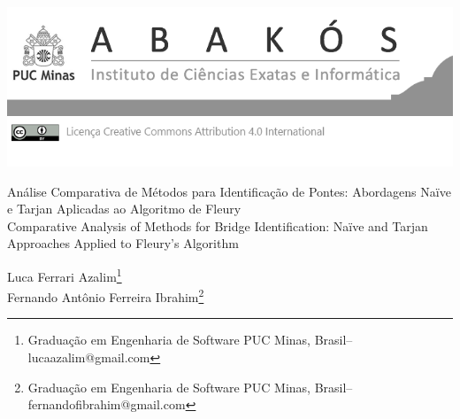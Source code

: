 \documentclass[a4paper,12pt,Times]{article}
\makeatletter
\newcommand{\monog}{Análise Comparativa de Métodos para Identificação de Pontes: Abordagens Naïve e Tarjan Aplicadas ao Algoritmo de Fleury}
\newcommand{\monogES}{Comparative Analysis of Methods for Bridge Identification: Naïve and Tarjan Approaches Applied to Fleury's Algorithm}
\newcommand{\origem}{Brasil}
\newcommand{\AutorA}{Luca Ferrari Azalim}
\newcommand{\funcaoA}{}
\newcommand{\emailA}{lucaazalim@gmail.com}
\newcommand{\cursA}{Graduação em Engenharia de Software PUC Minas}
\newcommand{\AutorB}{Fernando Antônio Ferreira Ibrahim}
\newcommand{\funcaoB}{}
\newcommand{\emailB}{fernandofibrahim@gmail.com}
\newcommand{\cursB}{Graduação em Engenharia de Software PUC Minas}
\makeatother
\begin{document}

\begin{flushleft}

\begin{minipage} [c][5cm][b]{16.5cm} %
\includegraphics[scale=1.1]{figuras/pucmg.png} 
\end{minipage}

 \vspace{0cm} {
 \singlespacing \Large{\monog {} \\ }
  \normalsize{\monogES}
 }
\end{flushleft}
\begin{flushright}
\singlespacing 
\normalsize{\AutorA \footnote{\funcaoA \cursA, \origem -- \emailA }} \\
\normalsize{\AutorB \footnote{\funcaoB \cursB, \origem -- \emailB}} \\
\end{flushright}
\thispagestyle{empty}
\end{document}
